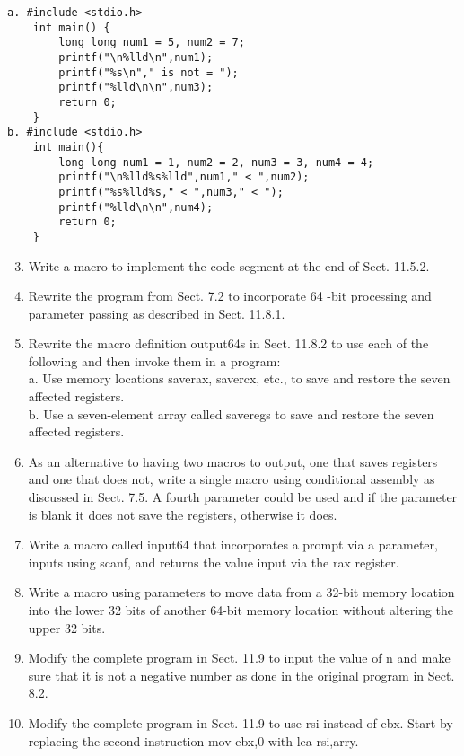 \documentclass[10pt]{article}
\begin{document}
\begin{verbatim}
a. #include <stdio.h>
    int main() {
        long long num1 = 5, num2 = 7;
        printf("\n%lld\n",num1);
        printf("%s\n"," is not = ");
        printf("%lld\n\n",num3);
        return 0;
    }
b. #include <stdio.h>
    int main(){
        long long num1 = 1, num2 = 2, num3 = 3, num4 = 4;
        printf("\n%lld%s%lld",num1," < ",num2);
        printf("%s%lld%s," < ",num3," < ");
        printf("%lld\n\n",num4);
        return 0;
    }
\end{verbatim}

\begin{enumerate}
  \setcounter{enumi}{2}
  \item Write a macro to implement the code segment at the end of Sect. 11.5.2.
  \item Rewrite the program from Sect. 7.2 to incorporate 64 -bit processing and parameter passing as described in Sect. 11.8.1.
  \item Rewrite the macro definition output64s in Sect. 11.8.2 to use each of the following and then invoke them in a program:\\
a. Use memory locations saverax, savercx, etc., to save and restore the seven affected registers.\\
b. Use a seven-element array called saveregs to save and restore the seven affected registers.
  \item As an alternative to having two macros to output, one that saves registers and one that does not, write a single macro using conditional assembly as discussed in Sect. 7.5. A fourth parameter could be used and if the parameter is blank it does not save the registers, otherwise it does.
  \item Write a macro called input64 that incorporates a prompt via a parameter, inputs using scanf, and returns the value input via the rax register.
  \item Write a macro using parameters to move data from a 32-bit memory location into the lower 32 bits of another 64-bit memory location without altering the upper 32 bits.
  \item Modify the complete program in Sect. 11.9 to input the value of n and make sure that it is not a negative number as done in the original program in Sect. 8.2.
  \item Modify the complete program in Sect. 11.9 to use rsi instead of ebx. Start by replacing the second instruction mov ebx,0 with lea rsi,arry.
\end{enumerate}
\end{document}
